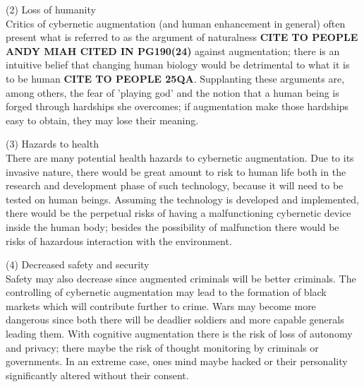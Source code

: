 (2) Loss of humanity \\

Critics of cybernetic augmentation (and human enhancement in general) often present what is referred to as the argument of naturalness {\bf CITE TO PEOPLE ANDY MIAH CITED IN PG190(24)} against augmentation; there is an intuitive belief that changing human biology would be detrimental to what it is to be human {\bf CITE TO PEOPLE 25QA}. Supplanting these arguments are, among others, the fear of 'playing god' and the notion that a human being is forged through hardships she overcomes; if augmentation make those hardships easy to obtain, they may lose their meaning.


(3) Hazards to health \\

There are many potential health hazards to cybernetic augmentation. Due to its invasive nature, there would be great amount to risk to human life both in the research and development phase of such technology, because it will need to be tested on human beings. Assuming the technology is developed and implemented, there would be the perpetual risks of having a malfunctioning cybernetic device inside the human body; besides the possibility of malfunction there would be risks of hazardous interaction with the environment.


(4) Decreased safety and security \\

Safety may also decrease since augmented criminals will be better criminals. The controlling of cybernetic augmentation may lead to the formation of black markets which will contribute further to crime. Wars may become more dangerous since both there will be deadlier soldiers and more capable generals leading them. With cognitive augmentation there is the risk of loss of autonomy and privacy; there maybe the risk of thought monitoring by criminals or governments. In an extreme case, ones mind maybe hacked or their personality significantly altered without their consent.

